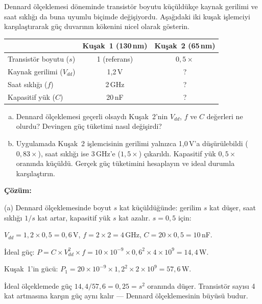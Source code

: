 \begin{ornek}[1.6]
\label{orn:dennard-guc-duvari}
Dennard ölçeklemesi döneminde transistör boyutu küçüldükçe kaynak gerilimi ve saat sıklığı da buna uyumlu biçimde değişiyordu. Aşağıdaki iki kuşak işlemciyi karşılaştırarak güç duvarının kökenini nicel olarak gösterin.

\begin{center}
\small
\begin{tabular}{lcc}
\toprule
& \textbf{Kuşak~1 (130\,nm)} & \textbf{Kuşak~2 (65\,nm)} \\
\midrule
Transistör boyutu ($s$)  & 1 (referans) & $0{,}5\times$ \\
Kaynak gerilimi ($V_{dd}$) & 1{,}2\,V & ? \\
Saat sıklığı ($f$) & 2\,GHz & ? \\
Kapasitif yük ($C$) & 20\,nF & ? \\
\bottomrule
\end{tabular}
\end{center}

\begin{enumerate}[(a)]
\item Dennard ölçeklemesi geçerli olsaydı Kuşak~2'nin $V_{dd}$, $f$ ve $C$ değerleri ne olurdu? Devingen güç tüketimi nasıl değişirdi?
\item Uygulamada Kuşak~2 işlemcisinin gerilimi yalnızca 1{,}0\,V'a düşürülebildi ($0{,}83\times$), saat sıklığı ise 3\,GHz'e ($1{,}5\times$) çıkarıldı. Kapasitif yük $0{,}5\times$ oranında küçüldü. Gerçek güç tüketimini hesaplayın ve ideal durumla karşılaştırın.
\end{enumerate}

\textbf{Çözüm:}

(a) Dennard ölçeklemesinde boyut $s$ kat küçüldüğünde: gerilim $s$ kat düşer, saat sıklığı $1/s$ kat artar, kapasitif yük $s$ kat azalır. $s = 0{,}5$ için:

$V_{dd} = 1{,}2 \times 0{,}5 = 0{,}6$\,V, \quad $f = 2 \times 2 = 4$\,GHz, \quad $C = 20 \times 0{,}5 = 10$\,nF.

İdeal güç: $P = C \times V_{dd}^2 \times f = 10 \times 10^{-9} \times 0{,}6^2 \times 4 \times 10^{9} = 14{,}4$\,W.

Kuşak~1'in gücü: $P_1 = 20 \times 10^{-9} \times 1{,}2^2 \times 2 \times 10^{9} = 57{,}6$\,W.

İdeal ölçeklemede güç \textbf{$14{,}4 / 57{,}6 = 0{,}25 = s^2$} oranında düşer. Transistör sayısı 4 kat artmasına karşın güç aynı kalır --- Dennard ölçeklemesinin büyüsü budur.


\end{ornek}
